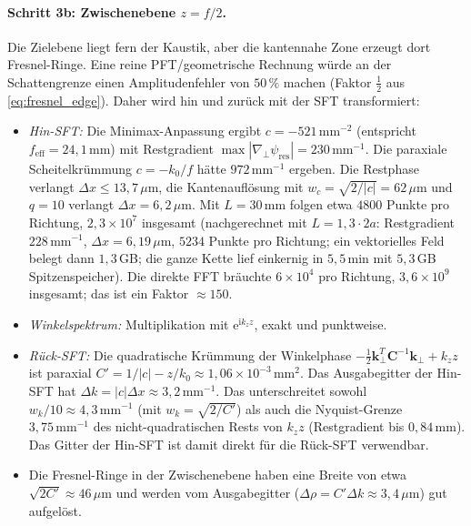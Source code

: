 \documentclass[11pt,a4paper]{scrartcl}
\theoremstyle{insightstyle}
\newcommand{\ii}{\mathrm{i}}
\newcommand{\ee}{\mathrm{e}}
\newcommand{\grad}{\nabla_{\!\perp}}
\newcommand{\kp}{\bm{k}_\perp}
\begin{document}
\paragraph{Schritt 3b: Zwischenebene $z=f/2$.} Die Zielebene liegt fern der Kaustik, aber die kantennahe Zone erzeugt dort Fresnel-Ringe. Eine reine PFT/geometrische Rechnung würde an der Schattengrenze einen Amplitudenfehler von $50\,\%$ machen (Faktor $\tfrac12$ aus \eqref{eq:fresnel_edge}). Daher wird hin und zurück mit der SFT transformiert:
\begin{itemize}
    \item \emph{Hin-SFT:} Die Minimax-Anpassung ergibt $c=-521\,\text{mm}^{-2}$ (entspricht $f_\text{eff}=24{,}1\,$mm) mit Restgradient $\max|\grad\psi_\text{res}|=230\,\text{mm}^{-1}$. Die paraxiale Scheitelkrümmung $c=-k_0/f$ hätte $972\,\text{mm}^{-1}$ ergeben. Die Restphase verlangt $\Delta x\le13{,}7\,\mu$m, die Kantenauflösung mit $w_c=\sqrt{2/|c|}=62\,\mu$m und $q=10$ verlangt $\Delta x=6{,}2\,\mu$m. Mit $L=30\,$mm folgen etwa $4800$ Punkte pro Richtung, $2{,}3\times10^7$ insgesamt (nachgerechnet mit $L=1{,}3\cdot2a$: Restgradient $228\,\text{mm}^{-1}$, $\Delta x=6{,}19\,\mu$m, $5234$ Punkte pro Richtung; ein vektorielles Feld belegt dann $1{,}3\,$GB; die ganze Kette lief einkernig in $5{,}5\,$min mit $5{,}3\,$GB Spitzenspeicher). Die direkte FFT bräuchte $6\times10^4$ pro Richtung, $3{,}6\times10^9$ insgesamt; das ist ein Faktor $\approx150$.
    \item \emph{Winkelspektrum:} Multiplikation mit $\ee^{\ii k_zz}$, exakt und punktweise.
    \item \emph{Rück-SFT:} Die quadratische Krümmung der Winkelphase $-\tfrac12\kp^T\bm C^{-1}\kp+k_zz$ ist paraxial $C'=1/|c|-z/k_0\approx1{,}06\times10^{-3}\,\text{mm}^2$. Das Ausgabegitter der Hin-SFT hat $\Delta k=|c|\Delta x\approx3{,}2\,\text{mm}^{-1}$. Das unterschreitet sowohl $w_k/10\approx4{,}3\,\text{mm}^{-1}$ (mit $w_k=\sqrt{2/C'}$) als auch die Nyquist-Grenze $3{,}75\,\text{mm}^{-1}$ des nicht-quadratischen Rests von $k_zz$ (Restgradient bis $0{,}84\,$mm). Das Gitter der Hin-SFT ist damit direkt für die Rück-SFT verwendbar.
    \item Die Fresnel-Ringe in der Zwischenebene haben eine Breite von etwa $\sqrt{2C'}\approx46\,\mu$m und werden vom Ausgabegitter ($\Delta\rho=C'\Delta k\approx3{,}4\,\mu$m) gut aufgelöst.
\end{itemize}
\end{document}
